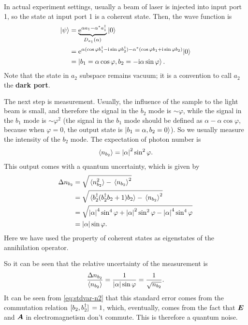 \documentclass[hyperref, a4paper]{article}
\newcommand*{\ii}{\mathrm{i}}
\newcommand*{\ee}{\mathrm{e}}
\newcommand*{\concept}[1]{{\textbf{#1}}}
\begin{document}
In actual experiment settings,
usually a beam of laser is injected into input port 1,
so the state at input port 1 is a coherent state.
Then, the wave function is 
\begin{equation}
    \begin{aligned}
        \ket{\psi} &= \underbrace{\ee^{\alpha a_1 - \alpha^* a_1^\dagger}}_{D_{a_1}(\alpha)} \ket{0} \\
        &= \ee^{\alpha (\cos \varphi b_1^\dagger - \ii \sin \varphi b_2^\dagger) -\alpha^{*} (\cos \varphi b_1 + \ii \sin \varphi b_2)}|0\rangle \\
        &= \ket{b_1 = \alpha \cos \varphi, b_2 = - \ii \alpha \sin \varphi} .
    \end{aligned}
    \label{eq:out-state}
\end{equation}
Note that the state in $a_2$ subspace remains vacuum;
it is a convention to call $a_2$ the \concept{dark port}.

The next step is measurement.
Usually, the influence of the sample to the light beam is small,
and therefore the signal in the $b_2$ mode is $\sim \varphi$,
while the signal in the $b_1$ mode is $\sim \varphi^2$
(the signal in the $b_1$ mode should be defined as $\alpha - \alpha \cos \varphi$,
because when $\varphi = 0$, the output state is $\ket{b_1 = \alpha, b_2 = 0}$).
So we usually measure the intensity of the $b_2$ mode.
The expectation of photon number is 
\begin{equation}
    \expval{n_{b_2}} = \abs{\alpha}^2 \sin^2 \varphi.
\end{equation}
This output comes with a quantum uncertainty, which is given by 
\begin{equation}
    \begin{aligned}
        \Delta n_{b_2} &= \sqrt{ \expval*{n_{b_2}^2} - \expval*{n_{b_2}}^2 } \\
        &= \sqrt{ \expval*{ b_2^\dagger (b_2^\dagger b_2 + 1) b_2} - \expval*{n_{b_2}}^2 } \\
        &= \sqrt{ \abs{\alpha}^4 \sin^4 \varphi + \abs{\alpha}^2 \sin^2 \varphi - \abs{\alpha}^4 \sin^4 \varphi } \\
        &= \abs{\alpha} \sin \varphi.
    \end{aligned}
    \label{eq:stdvar-n2}
\end{equation}
Here we have used the property of coherent states as eigenstates of the annihilation operator.

So it can be seen that the relative uncertainty of the measurement is 
\begin{equation}
    \frac{\Delta n_{b_2}}{\expval{n_{b_2}}} = \frac{1}{\abs{\alpha} \sin \varphi} = \frac{1}{\sqrt{n_{b_2}}}.
    \label{eq:relvar-n2}
\end{equation}
It can be seen from \eqref{eq:stdvar-n2} that this standard error comes from 
the commutation relation $\comm*{b_2}{b_2^\dagger} = 1$,
which, eventually, comes from the fact that $\vb*{E}$ and $\vb*{A}$ in electromagnetism don't commute.
This is therefore a quantum noise.
\end{document}
